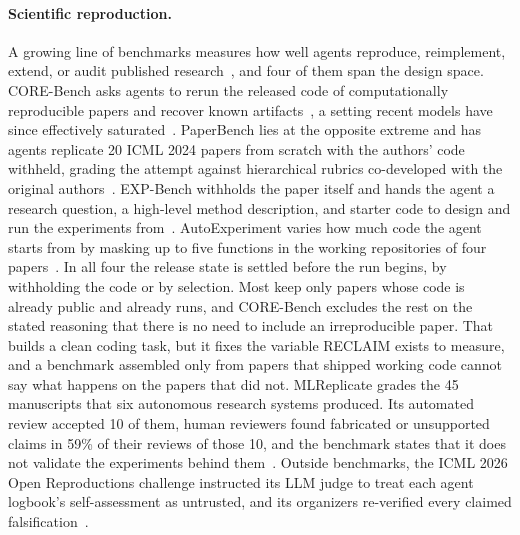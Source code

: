 \documentclass{article} %
\begin{document}
\paragraph{Scientific reproduction.}
A growing line of benchmarks measures how well agents reproduce, reimplement,
extend, or audit published research~\citep{bogin2024super,
xiang2025scireplicate,hua2025researchcodebench,
edwards2025rexbench,zhao2025speedrunning,nguyen2026replicatorbench,
wang2026researchenvbench,xiao2025csrbench,seo2025paper2code,zhao2025autoreproduce,
ye2025replicationbench,alizadeh2026socsci,li2026reprorepo,hu2026sabench,huang2026automat,
yan2025lmrbench,hu2025reproducibility}, and
four of them span the design space. CORE-Bench asks agents to rerun the
released code of computationally reproducible papers and recover known
artifacts~\citep{siegel2024corebench}, a setting recent models have since
effectively saturated~\citep{nadgir2026saturation}. PaperBench lies at the
opposite extreme and has agents replicate 20 ICML 2024 papers from scratch
with the authors' code withheld, grading the attempt against hierarchical
rubrics co-developed with the original authors~\citep{starace2025paperbench}.
EXP-Bench withholds the paper itself and hands the agent a research
question, a high-level method description, and starter code to design and
run the experiments from~\citep{kon2025expbench}. AutoExperiment varies how much code the
agent starts from by masking up to five functions in the working repositories
of four papers~\citep{kim2026autoexperiment}. In all four the release state is settled
before the run begins, by withholding the code or by selection. Most keep
only papers whose code is already public and already runs, and CORE-Bench
excludes the rest on the stated reasoning that there is no need to include
an irreproducible paper. That builds a clean coding task, but it fixes the
variable RECLAIM exists to measure, and a benchmark assembled only from
papers that shipped working code cannot say what happens on the papers that
did not.
MLReplicate grades the 45 manuscripts that six autonomous research systems produced. Its
automated review accepted 10 of them, human reviewers found fabricated or unsupported claims
in 59\% of their reviews of those 10, and the benchmark states that it does not validate the
experiments behind them~\citep{gaddipati2026mlreplicate}.
Outside benchmarks, the ICML 2026 Open Reproductions challenge instructed its
LLM judge to treat each agent logbook's self-assessment as untrusted, and its
organizers re-verified every claimed falsification~\citep{abid2026reproducing}.
\end{document}
